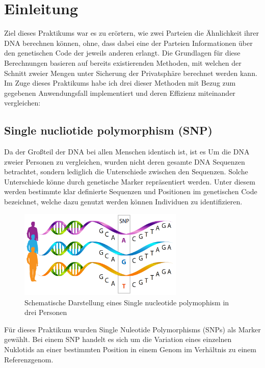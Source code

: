\chapter{Einleitung}
\label{sec:Chapter1}


Ziel dieses Praktikums war es zu erörtern, wie zwei Parteien die Ähnlichkeit ihrer DNA  berechnen können, ohne, dass dabei eine der Parteien Informationen über den genetischen Code der jeweils anderen erlangt.
Die Grundlagen für diese Berechnungen basieren auf bereits existierenden Methoden, mit welchen der Schnitt zweier Mengen unter Sicherung der Privatsphäre berechnet werden kann.
Im Zuge dieses Praktikums habe ich drei dieser Methoden mit Bezug zum gegebenen Anwendungsfall implementiert und deren Effizienz miteinander vergleichen:



\section{ Single nucliotide polymorphism (SNP)}

Da der Großteil der DNA bei allen Menschen identisch ist, ist es 
Um die DNA zweier Personen zu vergleichen, wurden nicht deren gesamte DNA Sequenzen  betrachtet, sondern lediglich die Unterschiede zwischen den Sequenzen.
Solche Unterschiede könne durch genetische Marker repräsentiert werden. Unter diesem werden bestimmte klar definierte Sequenzen und Positionen im genetischen Code bezeichnet, welche dazu genutzt werden können Individuen zu identifizieren.
\begin{figure}[htbp] 
	\centering
    \includegraphics[width=0.7\textwidth]{./Graphics/snp.png}
	\caption{Schematische Darstellung eines Single nucleotide polymophism in drei Personen }
	\label{fig:Bild1}
\end{figure}


Für dieses Praktikum wurden Single Nuleotide Polymorphisms (SNPs) als  Marker gewählt.
Bei einem SNP handelt es sich um die Variation eines einzelnen Nuklotids an einer bestimmten Position in einem Genom im Verhältnis zu einem Referenzgenom. 

